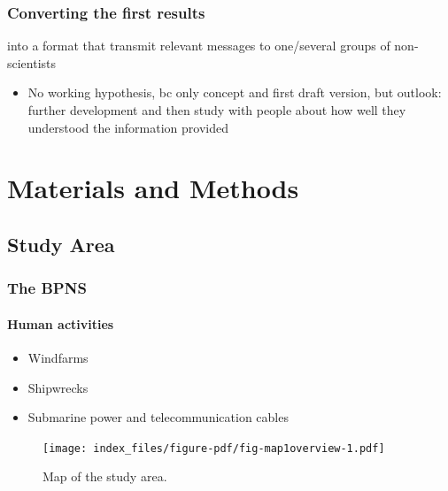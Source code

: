 \documentclass[
  authoryear,
  review,
  3p]{elsarticle}
\let\oldparagraph\paragraph
\renewcommand{\paragraph}[1]{\oldparagraph{#1}\mbox{}}
\providecommand{\tightlist}{%
  \setlength{\itemsep}{0pt}\setlength{\parskip}{0pt}}\usepackage{longtable,booktabs,array}
\begin{document}
\hypertarget{converting-the-first-results}{%
\subsubsection{Converting the first
results}\label{converting-the-first-results}}

into a format that transmit relevant messages to one/several groups of
non-scientists

\begin{itemize}
\tightlist
\item
  No working hypothesis, bc only concept and first draft version, but
  outlook: further development and then study with people about how well
  they understood the information provided
\end{itemize}

\hypertarget{sec-mm}{%
\section{Materials and Methods}\label{sec-mm}}

\hypertarget{sec-mm_studyarea}{%
\subsection{Study Area}\label{sec-mm_studyarea}}

\hypertarget{the-bpns}{%
\subsubsection{The BPNS}\label{the-bpns}}

\hypertarget{human-activities}{%
\paragraph{Human activities}\label{human-activities}}

\begin{itemize}
\tightlist
\item
  Windfarms
\item
  Shipwrecks
\item
  Submarine power and telecommunication cables
\end{itemize}

\begin{figure}

{\centering \texttt{[image: index\_files/figure-pdf/fig-map1overview-1.pdf]}

}

\caption{\label{fig-map1overview}Map of the study area.}

\end{figure}
\end{document}
